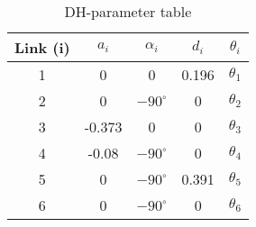 \begin{table}
\centering
  \captionsetup{justification=centering}
  \caption{DH-parameter table}
  \label{tab:rimini_dh_table}
\begin{tabular}{||c c c c c||} 
 \hline
  Link (i) & $a_i$ & $\alpha_i$ & $d_i$ & $\theta_i$\\ [0.5ex] 
 \hline\hline
 1 & 0  & 0 & 0.196 & $\theta_1$ \\ 
 \hline
  2 & 0 & $-90^{\circ}$ & 0 & $\theta_2$ \\
 \hline
  3 & -0.373  & 0 & 0 & $\theta_3$\\
 \hline
  4 & -0.08 &  $-90^{\circ}$ & 0 & $\theta_4$\\
 \hline
  5 & 0 & $-90^{\circ}$ & 0.391  & $\theta_5$ \\
 \hline
 6 & 0 & $-90^{\circ}$ & 0 & $\theta_6$ \\ [1ex] 
 \hline
\end{tabular}
\end{table}
